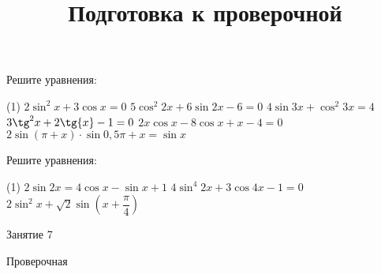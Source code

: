 \begin{homework}[number=3]
	\begin{listofex}
		\item Решите уравнения:
		\begin{tasks}(1)
			\task \( 2\sin^2x+3\cos{x}=0 \)
			\task \( 5\cos^2{2x}+6\sin{2x}-6=0 \)
			\task \( 4\sin{3x}+\cos^2{3x}=4 \)
			\task \( 3\tg^2{x}+2\tg{x}-1=0 \)
			\task \( 2x\cos{x}-8\cos{x}+x-4=0 \)
			\task \( 2\sin{(\pi+x)}\cdot \sin{0,5\pi+x}=\sin{x} \)
		\end{tasks}
		\item Решите уравнения:
		\begin{tasks}(1)
			\task \( 2\sin{2x}=4\cos{x}-\sin{x}+1 \)
			\task \( 4\sin^4{2x}+3\cos{4x}-1=0 \)
			\task \( 2\sin^2{x}+\sqrt{2}\sin{\left(  x+\dfrac{\pi}{4} \right) } \)
		\end{tasks}
	\end{listofex}
\end{homework}

\begin{class}[number=7]
	\title{Подготовка к проверочной}
	\begin{listofex}
		\item Занятие 7
	\end{listofex}
\end{class}

\begin{exam}
	\begin{listofex}
		\item Проверочная
	\end{listofex}
\end{exam}

